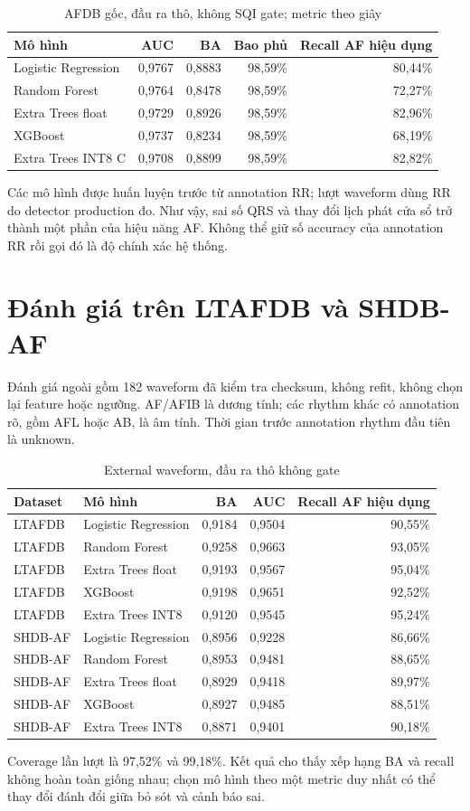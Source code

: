 \documentclass[12pt,a4paper,oneside]{report}
\begin{document}
\begin{table}[H]
\centering\small
\caption{AFDB gốc, đầu ra thô, không SQI gate; metric theo giây}
\begin{tabular}{lrrrr}
\toprule Mô hình & AUC & BA & Bao phủ & Recall AF hiệu dụng\\\midrule
Logistic Regression & 0,9767 & 0,8883 & 98,59\% & 80,44\%\\
Random Forest & 0,9764 & 0,8478 & 98,59\% & 72,27\%\\
Extra Trees float & 0,9729 & 0,8926 & 98,59\% & 82,96\%\\
XGBoost & 0,9737 & 0,8234 & 98,59\% & 68,19\%\\
Extra Trees INT8 C & 0,9708 & 0,8899 & 98,59\% & 82,82\%\\
\bottomrule
\end{tabular}
\end{table}
Các mô hình được huấn luyện trước từ annotation RR; lượt waveform dùng RR do detector production đo. Như vậy, sai số QRS và thay đổi lịch phát cửa sổ trở thành một phần của hiệu năng AF. Không thể giữ số accuracy của annotation RR rồi gọi đó là độ chính xác hệ thống.

\section{Đánh giá trên LTAFDB và SHDB-AF}
Đánh giá ngoài gồm 182 waveform đã kiểm tra checksum, không refit, không chọn lại feature hoặc ngưỡng. AF/AFIB là dương tính; các rhythm khác có annotation rõ, gồm AFL hoặc AB, là âm tính. Thời gian trước annotation rhythm đầu tiên là unknown.

\begin{table}[H]
\centering\small
\caption{External waveform, đầu ra thô không gate}
\begin{tabular}{llrrr}
\toprule Dataset & Mô hình & BA & AUC & Recall AF hiệu dụng\\\midrule
LTAFDB & Logistic Regression & 0,9184 & 0,9504 & 90,55\%\\
LTAFDB & Random Forest & 0,9258 & 0,9663 & 93,05\%\\
LTAFDB & Extra Trees float & 0,9193 & 0,9567 & 95,04\%\\
LTAFDB & XGBoost & 0,9198 & 0,9651 & 92,52\%\\
LTAFDB & Extra Trees INT8 & 0,9120 & 0,9545 & 95,24\%\\\midrule
SHDB-AF & Logistic Regression & 0,8956 & 0,9228 & 86,66\%\\
SHDB-AF & Random Forest & 0,8953 & 0,9481 & 88,65\%\\
SHDB-AF & Extra Trees float & 0,8929 & 0,9418 & 89,97\%\\
SHDB-AF & XGBoost & 0,8927 & 0,9485 & 88,51\%\\
SHDB-AF & Extra Trees INT8 & 0,8871 & 0,9401 & 90,18\%\\
\bottomrule
\end{tabular}
\end{table}
Coverage lần lượt là 97,52\% và 99,18\%. Kết quả cho thấy xếp hạng BA và recall không hoàn toàn giống nhau; chọn mô hình theo một metric duy nhất có thể thay đổi đánh đổi giữa bỏ sót và cảnh báo sai.
\end{document}
